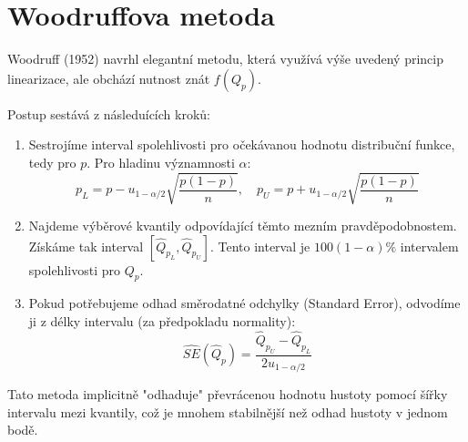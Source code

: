 \section{Woodruffova metoda}

Woodruff (1952) navrhl elegantní metodu, která využívá výše uvedený princip linearizace, ale obchází nutnost znát $f(Q_p)$.

Postup sestává z následuících kroků:
\begin{enumerate}
    \item Sestrojíme interval spolehlivosti pro očekávanou hodnotu distribuční funkce, tedy pro $p$. Pro hladinu významnosti $\alpha$:
    \begin{equation}
    p_L = p - u_{1-\alpha/2} \sqrt{\frac{p(1-p)}{n}}, \quad p_U = p + u_{1-\alpha/2} \sqrt{\frac{p(1-p)}{n}}
    \end{equation}
    \item Najdeme výběrové kvantily odpovídající těmto mezním pravděpodobnostem. Získáme tak interval $[ \hat{Q}_{p_L}, \hat{Q}_{p_U} ]$. Tento interval je $100(1-\alpha)\%$ intervalem spolehlivosti pro $Q_p$.
    \item Pokud potřebujeme odhad směrodatné odchylky (Standard Error), odvodíme ji z délky intervalu (za předpokladu normality):
    \begin{equation}
    \hat{SE}(\hat{Q}_p) = \frac{\hat{Q}_{p_U} - \hat{Q}_{p_L}}{2 u_{1-\alpha/2}}
    \end{equation}
\end{enumerate}
Tato metoda implicitně "odhaduje" převrácenou hodnotu hustoty pomocí šířky intervalu mezi kvantily, což je mnohem stabilnější než odhad hustoty v jednom bodě.
